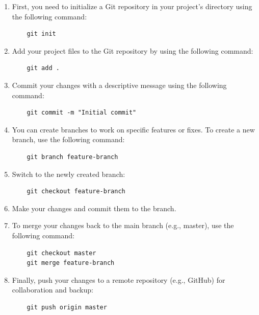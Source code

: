 \documentclass[11pt]{article}
\begin{document}
\begin{enumerate}
    \item First, you need to initialize a Git repository in your project's directory using the following command:

          \begin{verbatim}
    git init
    \end{verbatim}

    \item Add your project files to the Git repository by using the following command:

          \begin{verbatim}
    git add .
    \end{verbatim}

    \item Commit your changes with a descriptive message using the following command:

          \begin{verbatim}
    git commit -m "Initial commit"
    \end{verbatim}

    \item You can create branches to work on specific features or fixes. To create a new branch, use the following command:

          \begin{verbatim}
    git branch feature-branch
    \end{verbatim}

    \item Switch to the newly created branch:

          \begin{verbatim}
    git checkout feature-branch
    \end{verbatim}

    \item Make your changes and commit them to the branch.

    \item To merge your changes back to the main branch (e.g., master), use the following command:

          \begin{verbatim}
    git checkout master
    git merge feature-branch
    \end{verbatim}

    \item Finally, push your changes to a remote repository (e.g., GitHub) for collaboration and backup:

          \begin{verbatim}
    git push origin master
    \end{verbatim}

\end{enumerate}
\end{document}
